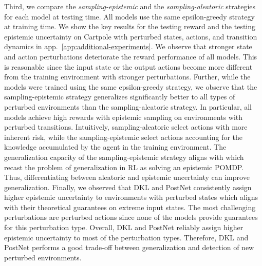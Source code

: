 Third, we compare the \emph{sampling-epistemic} and the \emph{sampling-aleatoric} strategies for each model at testing time. All models use the same epsilon-greedy strategy at training time. We show the key results for the testing reward and the testing epistemic uncertainty on Cartpole with perturbed states, actions, and transition dynamics
in app.~\ref{app:additional-experiments}. We observe that stronger state and action perturbations deteriorate the reward performance of all models. This is reasonable since the input state or the output actions become more different from the training environment with stronger perturbations. Further, while the models were trained using the same epsilon-greedy strategy, we observe that the sampling-epistemic strategy generalizes significantly better to all types of perturbed environments than the sampling-aleatoric strategy. In particular, all models achieve high rewards with epistemic sampling on environments with perturbed transitions. Intuitively, sampling-aleatoric select actions with more inherent risk, while the sampling-epistemic select actions accounting for the knowledge accumulated by the agent in the training environment. The generalization capacity of the sampling-epistemic strategy aligns with \cite{epistemic-pomdp} which recast the problem of generalization in RL as solving an epistemic POMDP. Thus, differentiating between aleatoric and epistemic uncertainty can improve generalization. Finally, we observed that DKL and PostNet consistently assign higher epistemic uncertainty to environments with perturbed states which aligns with their theoretical guarantees on extreme input states. The most challenging perturbations are perturbed actions since none of the models provide guarantees for this perturbation type. Overall, DKL and PostNet reliably assign higher epistemic uncertainty to most of the perturbation types. Therefore, DKL and PostNet performs a good trade-off between generalization and detection of new perturbed environments.

% 
%
%